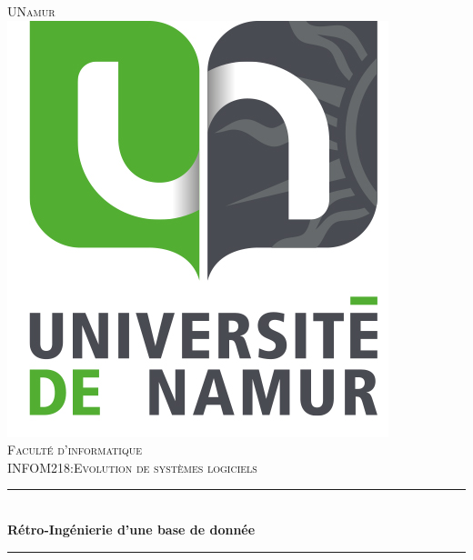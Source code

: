 \documentclass[a4paper,11pt]{article}
\begin{document}
\begin{titlepage}

    \newcommand{\HRule}{\rule{\linewidth}{0.5mm}} %

    \center %


    \textsc{\LARGE UNamur}\\[1.5cm] %
    \includegraphics[scale=0.33]{unamur.jpg}\\[1cm] %
    \textsc{\Large Faculté d’informatique}\\[0.5cm] %
    \textsc{\large INFOM218:Evolution de systèmes logiciels}\\[0.5cm] %


    \HRule \\[0.4cm]
    { \huge \bfseries Rétro-Ingénierie d'une base de donnée}\\[0.4cm] %
    \HRule \\[1.5cm]


\end{titlepage}
\end{document}
